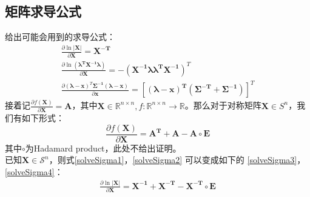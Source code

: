 \documentclass[12pt,a4paper]{ctexart}
\begin{document}
\subsection*{矩阵求导公式}
\noindent 给出可能会用到的求导公式：
\begin{gather}
\frac{\partial{\ln{|\boldsymbol{X}|}}}{\partial{\boldsymbol {X}}}=\boldsymbol{X^{-T}} \label{solveSigma1}\\
\frac{\partial{\ln(\boldsymbol{\lambda^T X^{-1}\lambda})}}{\partial{\boldsymbol{X}}}=-(\boldsymbol{X^{-1} \lambda \lambda^T X^{-1}})^T  \label{solveSigma2}\\
\frac{\partial{(\boldsymbol{\lambda-x})^T \boldsymbol{\Sigma^{-1}} (\boldsymbol{\lambda-x})}}{\partial{\boldsymbol{x}}}=[\boldsymbol{(\lambda-x)^T (\Sigma^{-T}+\Sigma^{-1})}]^T \label{solveu}
\end{gather}
接着记$\frac{\partial{f(\boldsymbol{X})}}{\partial{\boldsymbol{X}}}=\boldsymbol{A}$，其中$\boldsymbol{X} \in \mathbb{R}^{n \times n} ,f:\mathbb{R}^{n \times n} \rightarrow \mathbb{R}$。那么对于对称矩阵$\boldsymbol{X} \in S^n$，我们有如下形式：
\begin{equation}
\frac{\partial{f(\boldsymbol{X})}}{\partial{\boldsymbol{X}}}=\boldsymbol{A^T +A - A\circ E}
\end{equation}
其中$\circ$为Hadamard product，此处不给出证明。\\
\noindent 已知$\boldsymbol{X} \in \mathcal{S}^n $，则式\eqref{solveSigma1}，\eqref{solveSigma2} 可以变成如下的 \eqref{solveSigma3}，\eqref{solveSigma4}：
\begin{align}
\frac{\partial{\ln{|\boldsymbol{X}|}}}{\partial{\boldsymbol {X}}}
=\boldsymbol{X^{-1}}+\boldsymbol{X^{-T}}-\boldsymbol{X^{-T}}\circ \boldsymbol{E} 
\label{solveSigma3}
\end{align}
\end{document}

